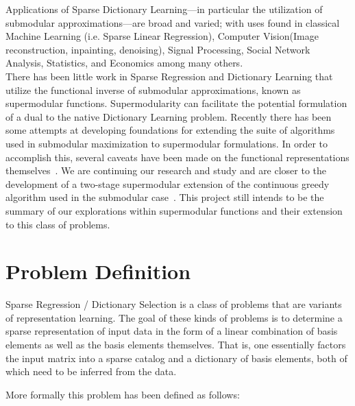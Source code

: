 \documentclass{article}
\begin{document}
\noindent Applications of Sparse Dictionary Learning---in particular the utilization of submodular approximations---are broad and varied; with uses found in classical Machine Learning (i.e. Sparse Linear Regression), Computer Vision(Image reconstruction, inpainting, denoising), Signal Processing\cite{nonconvexrelax}\cite{submod_sparsecoding}, Social Network Analysis, Statistics\cite{rIBP}, and Economics\cite{utilityWelfare} among many others. 
\\

\noindent There has been little work in Sparse Regression and Dictionary Learning that utilize the functional inverse of submodular approximations, known as supermodular functions. Supermodularity can facilitate the potential formulation of a dual to the native Dictionary Learning problem. Recently there has been some attempts at developing foundations for extending the suite of algorithms used in submodular maximization to supermodular formulations. In order to accomplish this, several caveats have been made on the functional representations themselves~\cite{BoutsidisLS15}. We are continuing our research and study and are closer to the development of a two-stage supermodular extension of the continuous greedy algorithm used in the submodular case~\cite{Singer16TwoStage}. This project still intends to be the summary of our explorations within supermodular functions and their extension to this class of problems.


\section{Problem Definition}\label{sec:problem}

Sparse Regression / Dictionary Selection is a class of problems that are variants of representation learning. The goal of these kinds of problems is to determine a sparse representation of input data in the form of a linear combination of basis elements as well as the basis elements themselves. That is, one essentially factors the input matrix into a sparse catalog and a dictionary of basis elements, both of which need to be inferred from the data.
\newline

\noindent More formally this problem has been defined as follows:
\newline
\end{document}
